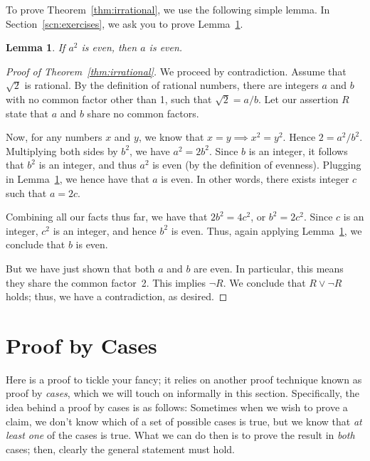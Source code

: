 \documentclass[11pt]{article}
\newcounter{thm}
\newtheorem{lemma}{Lemma}[thm]
\begin{document}
To prove Theorem~\ref{thm:irrational}, we use the following simple lemma. In Section~\ref{scn:exercises}, we ask you to prove Lemma~\ref{lem:asquared}.

\begin{lemma}\label{lem:asquared}
    If $a^2$ is even, then $a$ is even.
\end{lemma}

\begin{proof}[Proof of Theorem~\ref{thm:irrational}]
We proceed by contradiction. Assume that $\sqrt{2}$ is rational. By the definition of rational numbers, there are integers $a$ and $b$ with no common factor other than 1, such that $\sqrt{2} = a/b$. Let our assertion $R$ state that $a$ and $b$ share no common factors.

Now, for any numbers $x$ and $y$, we know that $x = y \implies x^2 = y^2$. Hence $2 = {a^2}/{b^2}$. Multiplying both sides by $b^2$, we have $a^2 = 2b^2$. Since $b$ is an integer, it follows that $b^2$ is an integer, and thus $a^2$ is even (by the definition of evenness). Plugging in Lemma~\ref{lem:asquared}, we hence have that $a$ is even. In other words, there exists integer $c$ such that $a = 2c$.

Combining all our facts thus far, we have that $2b^2 = 4 c^2$, or $b^2 = 2 c^2$. Since $c$ is an integer, $c^2$ is an integer, and hence $b^2$ is even. Thus, again applying Lemma~\ref{lem:asquared}, we conclude that $b$ is even.

But we have just shown that both $a$ and $b$ are even. In particular, this means they share the common factor~2. This implies $\neg R$. We conclude that $R\vee \neg R$ holds; thus, we have a contradiction, as desired.
\end{proof}


\section{Proof by Cases}\label{scn:cases}

Here is a proof to tickle your fancy; it relies on another proof technique known as proof by \emph{cases}, which we will touch on informally in this section. Specifically, the idea behind a proof by cases is as follows: Sometimes when we wish to prove a claim, we don't know which of a set of possible cases is true, but we know that \emph{at least one} of the cases is true. What we can do then is to prove the result in \emph{both} cases; then, clearly the general statement must hold.
\end{document}
